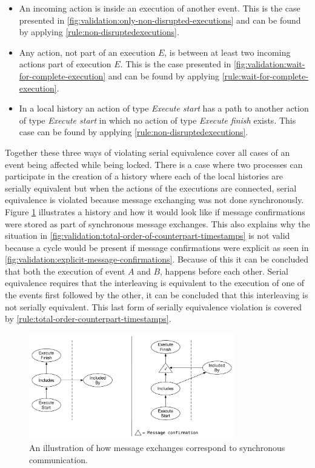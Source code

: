 	\begin{itemize}
		\item An incoming action is inside an execution of another event. This is the case presented in \autoref{fig:validation:only-non-disrupted-executions} and can be found by applying \autoref{rule:non-disruptedexecutions}.
		\item Any action, not part of an execution $E$, is between at least two incoming actions part of execution $E$. This is the case presented in \autoref{fig:validation:wait-for-complete-execution} and can be found by applying \autoref{rule:wait-for-complete-execution}.
		\item In a local history an action of type \textit{Execute start} has a path to another action of type \textit{Execute start} in which no action of type \textit{Execute finish} exists. This case can be found by applying \autoref{rule:non-disruptedexecutions}.
	\end{itemize}
	
	Together these three ways of violating serial equivalence cover all cases of an event being affected while being locked. There is a case where two processes can participate in the creation of a history where each of the local histories are serially equivalent but when the actions of the executions are connected, serial equivalence is violated because message exchanging was not done synchronously. Figure \ref{fig:validation:synchronous-execution} illustrates a history and how it would look like if message confirmations were stored as part of synchronous message exchanges. This also explains why the situation in \autoref{fig:validation:total-order-of-counterpart-timestamps} is not valid because a cycle would be present if message confirmations were explicit as seen in \autoref{fig:validation:explicit-message-confirmations}. Because of this it can be concluded that both the execution of event $A$ and $B$, happens before each other. Serial equivalence requires that the interleaving is equivalent to the execution of one of the events first followed by the other, it can be concluded that this interleaving is not serially equivalent. This last form of serially equivalence violation is covered by \autoref{rule:total-order-counterpart-timestamps}.
	
	\begin{figure}[H]
		\centering
		\includegraphics[width=0.8\textwidth]{5validation/images/synchronous-execution.pdf}
		\caption{An illustration of how message exchanges correspond to synchronous communication.}
		\label{fig:validation:synchronous-execution}
	\end{figure}
	
